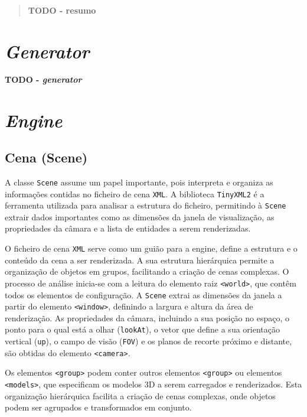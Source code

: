 \documentclass[12pt, a4paper]{article}
\begin{document}
\pagebreak

\begin{abstract}
    \textbf{\color{red} TODO - resumo}
\end{abstract}

\section{\emph{Generator}}

\textbf{\color{red} TODO - \emph{generator}}

\section{\emph{Engine}}

\subsection{Cena (Scene)}

A classe \texttt{Scene} assume um papel importante, pois interpreta e organiza as informações
contidas no ficheiro de cena \texttt{XML}. A biblioteca \texttt{TinyXML2} é a ferramenta utilizada
para analisar a estrutura do ficheiro, permitindo à \texttt{Scene} extrair dados importantes como as
dimensões da janela de visualização, as propriedades da câmara e a lista de entidades a serem
renderizadas.

O ficheiro de cena \texttt{XML} serve como um guião para a engine, define a estrutura e o conteúdo
da cena a ser renderizada. A sua estrutura hierárquica permite a organização de objetos em grupos,
facilitando a criação de cenas complexas.
O processo de análise inicia-se com a leitura do elemento raiz \texttt{<world>}, que contêm todos os
elementos de configuração. A \texttt{Scene} extrai as dimensões da janela a partir do
elemento \texttt{<window>}, definindo a largura e altura da área de renderização. As propriedades da
câmara, incluindo a sua posição no espaço, o ponto para o qual está a olhar (\texttt{lookAt}), o
vetor que define a sua orientação vertical (\texttt{up}), o campo de visão (\texttt{FOV}) e os
planos de recorte próximo e distante, são obtidas do elemento \texttt{<camera>}.

Os elementos \texttt{<group>} podem conter outros elementos \texttt{<group>} ou elementos
\texttt{<models>}, que especificam os modelos 3D a serem carregados e renderizados. Esta organização
hierárquica facilita a criação de cenas complexas, onde objetos podem ser agrupados e transformados
em conjunto.
\end{document}
